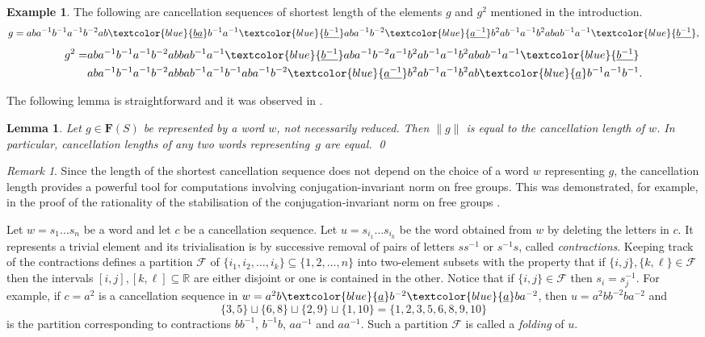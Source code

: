 \documentclass[12pt,reqno,a4paper]{article}
\newtheorem{lemma}[theorem]{Lemma}
\theoremstyle{definition}
\newtheorem{example}[theorem]{Example}
\theoremstyle{remark}
\newtheorem{remark}[theorem]{Remark}
\numberwithin{equation}{section}
\numberwithin{figure}{section}
\newcommand{\B}[1]{{\mathbf #1}}
\newcommand{\C}[1]{{\mathscr #1}}
\begin{document}
\begin{example}\label{E:gg2}
The following are cancellation sequences of shortest length of the elements $g$ and $g^2$ mentioned in the
introduction.
\[
g = aba^{-1}b^{-1}a^{-1}b^{-2}ab\textcolor{blue}{\underline{ba}}b^{-1}a^{-1}\textcolor{blue}{\underline{b^{-1}}}aba^{-1}b^{-2}\textcolor{blue}{\underline{a^{-1}}}b^{2}ab^{-1}a^{-1}b^{2}abab^{-1}a^{-1}\textcolor{blue}{\underline{b^{-1}}},
\]
\begin{align*}
g^2 = &aba^{-1}b^{-1}a^{-1}b^{-2}abbab^{-1}a^{-1}\textcolor{blue}{\underline{b^{-1}}}aba^{-1}b^{-2}a^{-1}b^{2}ab^{-1}a^{-1}b^{2}abab^{-1}a^{-1}\textcolor{blue}{\underline {b^{-1}}}\\
&aba^{-1}b^{-1}a^{-1}b^{-2}abbab^{-1}a^{-1}b^{-1}aba^{-1}b^{-2}\textcolor{blue}{\underline{a^{-1}}}b^{2}ab^{-1}a^{-1}b^{2}ab\textcolor{blue}{\underline{a}}b^{-1}a^{-1}b^{-1}.
\end{align*}
\end{example}


The following lemma is straightforward and it was observed in 
\cite[Proposition 2.5]{zbMATH06532523}.
\begin{lemma}\label{L:cancel}
Let $g\in \B F(S)$ be represented by a word $w$, not necessarily reduced. 
Then $\|g\|$ is equal to the cancellation length of $w$. In particular, cancellation lengths of any two words representing~$g$ are equal.
\qed
\end{lemma}

\begin{remark}
Since the length of the shortest cancellation sequence does not depend on the choice of a word $w$ representing $g$, the cancellation length provides a powerful tool for computations
involving conjugation-invariant norm on free groups. This was demonstrated,
for example, in the proof of the rationality of the stabilisation of
the conjugation-invariant norm on free groups \cite{zbMATH07843754}.
\end{remark}

Let $w=s_1\dots s_n$ be a word and let $c$ be a cancellation sequence.
Let $u=s_{i_1}\dots s_{i_{k}}$ be the word obtained from $w$ by deleting
the letters in $c$. It represents a trivial element and
its trivialisation is by successive removal of pairs of letters $ss^{-1}$
or $s^{-1}s$, called {\em contractions}. Keeping track
of the contractions defines a partition $\C F$ of 
$\{i_1,i_2,\ldots,i_{k}\}\subseteq \{1,2,\ldots,n\}$ into
two-element subsets with the property that if $\{i,j\},\{k,\ell\}\in \C F$
then the intervals $[i,j],[k,\ell]\subseteq \mathbb R$ are either disjoint or one is contained in the other. Notice that if $\{i,j\}\in \C F$ then $s_i = s_j^{-1}$.
For example, if $c=a^2$ is a cancellation sequence in 
$w = a^2b\textcolor{blue}{\underline{a}}b^{-2}\textcolor{blue}{\underline{a}}ba^{-2}$, 
then 
$u = a^2bb^{-2}ba^{-2}$ and 
$$
\{3,5\}\sqcup \{6,8\}\sqcup \{2,9\}\sqcup \{1,10\}=\{1,2,3,5,6,8,9,10\}
$$
is the partition corresponding to contractions $bb^{-1}$, $b^{-1}b$, $aa^{-1}$
and $aa^{-1}$. Such a partition $\C F$ is called a {\em folding} of $u$.
\end{document}
